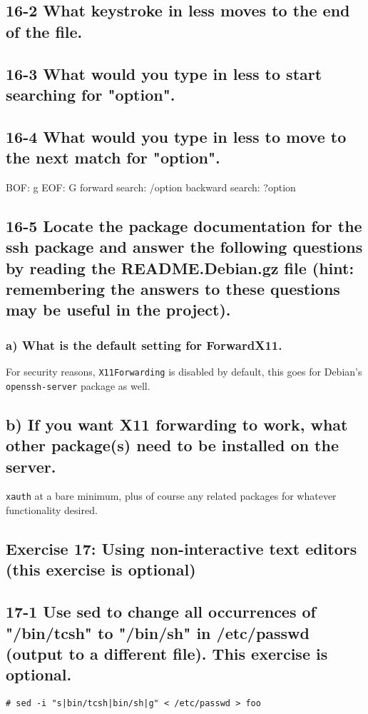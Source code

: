 \subsection{16-2 What keystroke in less moves to the end of the file.}
\subsection{16-3 What would you type in less to start searching for "option".}
\subsection{16-4 What would you type in less to move to the next match for "option".}
BOF: g
EOF: G
forward search: /option
backward search: ?option

\subsection{16-5 Locate the package documentation for the ssh package and answer the following questions by reading the README.Debian.gz file (hint: remembering the answers to these questions may be useful in the project).}

\subsubsection{a) What is the default setting for ForwardX11.}
For security reasons, \verb=X11Forwarding= is disabled by default, this goes for Debian's \verb=openssh-server= package as well.

\subsection{b) If you want X11 forwarding to work, what other package(s) need to be installed on the server.}
\verb=xauth= at a bare minimum, plus of course any related packages for whatever functionality desired.



\subsection{Exercise 17: Using non-interactive text editors (this exercise is optional)}
\subsection{17-1 Use sed to change all occurrences of "/bin/tcsh" to "/bin/sh" in /etc/passwd (output to a different file). This exercise is optional.}
\verb=# sed -i "s|bin/tcsh|bin/sh|g" < /etc/passwd > foo=

